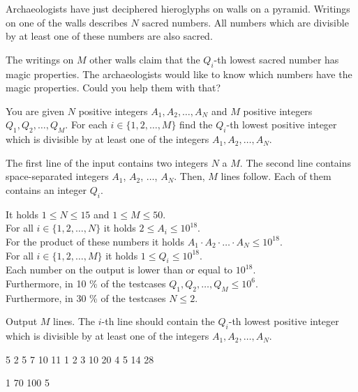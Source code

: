 





Archaeologists have just deciphered hieroglyphs on walls on a pyramid. Writings
on one of the walls describes $N$ sacred numbers. All numbers which are
divisible by at least one of these numbers are also sacred.

The writings on $M$ other walls claim that the $Q_i$-th lowest sacred number has
magic properties. The archaeologists would like to know which numbers have the
magic properties. Could you help them with that?


You are given $N$ positive integers $A_1, A_2, \ldots, A_N$ and $M$ positive
integers $Q_1, Q_2, \ldots, Q_M$. For each $i \in \{ 1, 2, \ldots, M \}$ find the
$Q_i$-th lowest positive integer which is divisible by at least one of the
integers $A_1, A_2, \ldots, A_N$.


The first line of the input contains two integers $N$ a $M$. The second line
contains space-separated integers $A_1$, $A_2$, $\ldots$, $A_N$. Then, $M$ lines
follow. Each of them contains an integer $Q_i$.

\bigskip
\noindent
It holds $1 \leq N \leq 15$ and $1 \leq M \leq 50$.\\
For all $i \in \{ 1, 2, \ldots, N \}$ it holds $2 \leq A_i \leq 10^{18}$.\\
For the product of these numbers it holds $A_1 \cdot A_2 \cdot \ldots \cdot A_N \leq 10^{18}$.\\
For all $i \in \{ 1, 2, \ldots, M \}$ it holds $1 \leq Q_i \leq 10^{18}$.\\
Each number on the output is lower than or equal to $10^{18}$.\\
Furthermore, in 10 \% of the testcases $Q_1, Q_2, \ldots, Q_M \leq 10^6$.\\
Furthermore, in 30 \% of the testcases $N \leq 2$.


Output $M$ lines. The $i$-th line should contain the $Q_i$-th lowest positive
integer which is divisible by at least one of the integers
$A_1, A_2, \ldots, A_N$.


 5
2 5 7 10 11
1
2
3
10
20
4
5
14
28
\sampleEND

 1
70 100
5
\sampleEND


